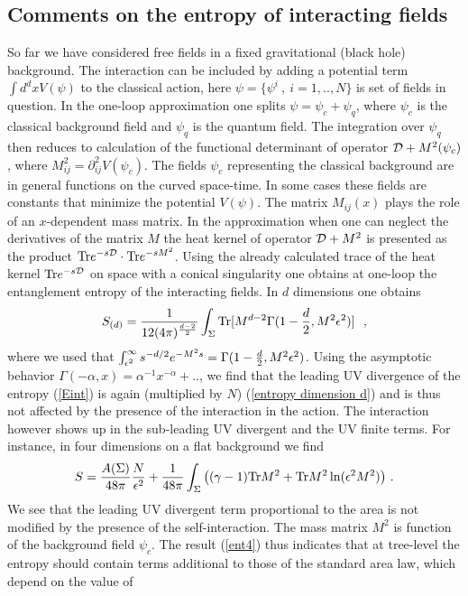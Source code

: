 \documentclass[12pt]{article}
\def\tr{\hbox{Tr}}
\def\Tr{\hbox{Tr}}
\def\be{\begin{eqnarray}}
\def\ee{\end{eqnarray}}
\def\lb{\label}
\def\o{\over}
\begin{document}
\subsection{Comments on the entropy of interacting fields}

So far we have considered
   free fields in a fixed gravitational (black hole) background.  The interaction can be included by adding a potential
term $\int d^dx V(\psi)$ to the classical action, here
$\psi=\{\psi^i~, ~i=1,..,N\}$ is  set of fields in
question.
In the  one-loop approximation one splits
$\psi=\psi_c+\psi_q$, where $\psi_c$ is the classical
background field and $\psi_q$ is the quantum field. The
integration over $\psi_q$ then  reduces to calculation of the
functional determinant of operator ${\cal D}+M^2(\psi_c)$,
where $M^2_{ij}=\partial^2_{ij} V(\psi_c)$.   The fields $\psi_c$ representing the classical background  are in general  functions on the curved space-time. In some cases these fields are constants   that minimize the potential
$V(\psi)$.  The matrix $M_{ij}(x)$ plays the role of  an $x$-dependent mass matrix.
In the approximation when one can neglect the derivatives of the matrix $M$ the heat kernel
of  operator ${\cal D}+M^2$ is presented as the product  $\tr  e^{-s{\cal D}}\cdot \tr e^{-sM^2}$.
Using the already calculated trace of the heat kernel $\tr e^{-s{\cal D}}$ on space with a conical singularity  one obtains  at one-loop the entanglement entropy of the interacting fields. In $d$ dimensions one obtains \cite{Solodukhin:2009sk}
\be
S_{(d)}={1\over 12(4\pi)^{d-2\over
2}}\int_\Sigma\Tr[M^{d-2}\Gamma(1-{d\over 2},M^2\epsilon^2)]~~,
\label{Eint}\ee where we used that $\int_{\epsilon^2}^\infty
s^{-d/2}e^{-M^2s}=\Gamma(1-{d\over 2},M^2\epsilon^2)$. Using the
asymptotic behavior $\Gamma
(-\alpha,x)=\alpha^{-1}x^{-\alpha}+..$, we find that the leading
UV divergence of the entropy (\ref{Eint}) is again (multiplied by
$N$) (\ref{entropy dimension d}) and is thus not affected by the presence of the
interaction in the action. The interaction however shows up in the
sub-leading UV divergent and the UV finite terms. For instance, in
four dimensions on a flat background we find \be S={A(\Sigma)\over 48\pi} {N\over
\epsilon^2}+{1\o 48\pi}\int_\Sigma \left((\gamma-1)\Tr M^2+\tr M^2\ln(\epsilon^2 M^2)\right)\, .\lb{ent4}
\ee 
We see that the leading UV divergent term proportional to the area is not modified by the presence of the self-interaction.
The mass matrix $M^2$ is function of the background field $\psi_c$. The result (\ref{ent4}) thus indicates that
at  tree-level the entropy should contain terms additional to those of the standard area law, which depend on the value of
\end{document}
